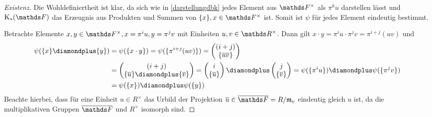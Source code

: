 \documentclass[ngerman,fontsize=11pt, paper=a4, parskip=half, titlepage=true, toc=bib]{scrartcl}
\begin{document}
\begin{proof}[Existenz]
  Die Wohldefiniertheit ist klar, da sich wie in \ref{darstellungdbk}
  jedes Element aus $\Fx$ als $\pi^k u$ darstellen lässt und
  $\KF$ das Erzeugnis aus Produkten und Summen von $\{x\}, x\in\Fx$
  ist. Somit ist $\psi$ für jedes Element eindeutig bestimmt.

  Betrachte Elemente $x,y\in\Fx, x=\pi^iu, y=\pi^jv$ mit Einheiten
  $u,v\in\R^\times$. 
  Dann gilt $x\cdot y=\pi^iu\cdot\pi^jv=\pi^{i+j}(uv)$  und
  \begin{align*}
    \psi(\{x\}\p\{y\})
    &=\psi(\{x\cdot y\})=\psi(\{\pi^{i+j}(uv)\})
      =\begin{pmatrix}(i+j)\\\{\ov{uv}\}\end{pmatrix}\\
    &=\begin{pmatrix}(i+j)\\\{\ov u \}\p \{\ov v\}\end{pmatrix}
    = \begin{pmatrix}i\\\{\ov u\}\end{pmatrix}
    \p\begin{pmatrix}j\\\{\ov v\}\end{pmatrix}
    =\psi(\{\pi^iu\})\p \psi(\{\pi^jv\})\\
    &= \psi(\{x\})\p\psi(\{y\})
  \end{align*}
  Beachte hierbei, dass für eine Einheit $u\in R^\times$ das Urbild
  der Projektion $\ov u\in\bF=R/\frakm_v$ eindeutig gleich $u$ ist,
  da die multiplikativen Gruppen $\bF$ und $R^\times$ isomorph sind.


\end{proof}
\end{document}
